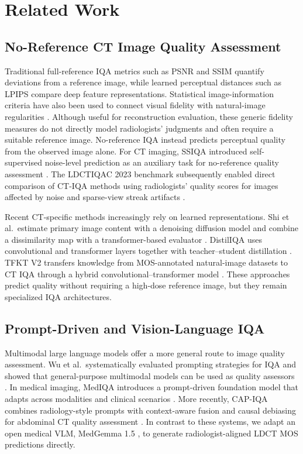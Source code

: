 \chapter{Related Work}
\section{No-Reference CT Image Quality Assessment}
Traditional full-reference IQA metrics such as PSNR and SSIM \cite{wang2004image} quantify deviations from a reference image, while learned perceptual distances such as LPIPS \cite{zhang2018unreasonable} compare deep feature representations. Statistical image-information criteria have also been used to connect visual fidelity with natural-image regularities \cite{sheikh2006statistical}. Although useful for reconstruction evaluation, these generic fidelity measures do not directly model radiologists' judgments and often require a suitable reference image. No-reference IQA instead predicts perceptual quality from the observed image alone. For CT imaging, SSIQA introduced self-supervised noise-level prediction as an auxiliary task for no-reference quality assessment \cite{imran2021ssiqa}. The LDCTIQAC 2023 benchmark subsequently enabled direct comparison of CT-IQA methods using radiologists' quality scores for images affected by noise and sparse-view streak artifacts \cite{lee2025low}.

Recent CT-specific methods increasingly rely on learned representations. Shi et al.\ estimate primary image content with a denoising diffusion model and combine a dissimilarity map with a transformer-based evaluator \cite{shi2024blind}. DistilIQA uses convolutional and transformer layers together with teacher--student distillation \cite{baldeoncalisto2024distiliqa}. TFKT V2 transfers knowledge from MOS-annotated natural-image datasets to CT IQA through a hybrid convolutional--transformer model \cite{rifa2025tfkt}. These approaches predict quality without requiring a high-dose reference image, but they remain specialized IQA architectures.

\section{Prompt-Driven and Vision-Language IQA}
Multimodal large language models offer a more general route to image quality assessment. Wu et al.\ systematically evaluated prompting strategies for IQA and showed that general-purpose multimodal models can be used as quality assessors \cite{wu2024comprehensive}. In medical imaging, MedIQA introduces a prompt-driven foundation model that adapts across modalities and clinical scenarios \cite{xun2025mediqa}. More recently, CAP-IQA combines radiology-style prompts with context-aware fusion and causal debiasing for abdominal CT quality assessment \cite{rifa2026capiqa}. In contrast to these systems, we adapt an open medical VLM, MedGemma 1.5 \cite{sellergren2026medgemma}, to generate radiologist-aligned LDCT MOS predictions directly.

